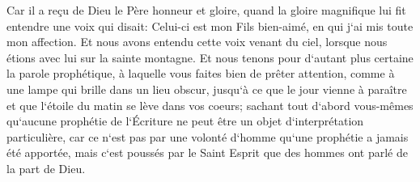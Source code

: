 \verse Car il a reçu de Dieu le Père honneur et gloire, quand la gloire magnifique lui fit entendre une voix qui disait: Celui-ci est mon Fils bien-aimé, en qui j`ai mis toute mon affection. 
\verse Et nous avons entendu cette voix venant du ciel, lorsque nous étions avec lui sur la sainte montagne. 
\verse Et nous tenons pour d`autant plus certaine la parole prophétique, à laquelle vous faites bien de prêter attention, comme à une lampe qui brille dans un lieu obscur, jusqu`à ce que le jour vienne à paraître et que l`étoile du matin se lève dans vos coeurs; 
\verse sachant tout d`abord vous-mêmes qu`aucune prophétie de l`Écriture ne peut être un objet d`interprétation particulière, 
\verse car ce n`est pas par une volonté d`homme qu`une prophétie a jamais été apportée, mais c`est poussés par le Saint Esprit que des hommes ont parlé de la part de Dieu. 

\chapter{}

